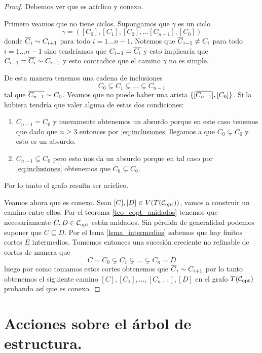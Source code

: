 \documentclass[tesis.tex]{subfiles}
\begin{document}
\begin{proof}
	Debemos ver que es acíclico y conexo.
	
	Primero veamos que no tiene ciclos.
	Supongamos que $\gamma$	es un ciclo
	\[
		\gamma = ([C_0], [C_1], [C_2], \dots [C_{n-1}], [C_0])
	\]
	donde $\overline C_{i} \sim C_{i+1}$ para todo $i=1 \dots n-1$.
	Notemos que $\overline C_{i-1} \neq C_{i}$ para todo $i=1 \dots n-1$ sino tendríamos que $C_{i-1} = \overline{ C_{i}}$ y esto implicaría que $C_{i-1} = \overline{C_{i}} \sim C_{i-1}$
	y esto contradice que el camino $\gamma$ no es simple.
	
	De esta manera tenemos una cadena de inclusiones
	\begin{equation}\label{eq:inclusiones}
			C_0 \subsetneq C_1 \subsetneq \dots  \subsetneq C_{n-1}
	\end{equation}
	tal que $\overline{ C_{n-1}} \sim C_0$.
	Veamos que no puede haber una arista $\{[\overline{ C_{n-1}}], [C_0]\}$.
	Si la hubiera tendría que valer alguna de estas dos condiciones:
	\begin{enumerate}
		\item $C_{n-1} = C_{0}$ y nuevamente obtenemos un absurdo porque en este caso tenemos que dado que $n \ge 3$ entonces por \ref{eq:inclusiones} llegamos a que $C_{0} \subsetneq C_{0}$ y esto es un absurdo.
		
		\item ${C_{n-1}} \subsetneq C_{0}$ pero esto nos da un absurdo porque en tal caso por \ref{eq:inclusiones} obtenemos que $C_{0} \subsetneq C_{0}$.
	\end{enumerate}
	Por lo tanto el grafo resulta ser acíclico.
	
	Veamos ahora que es conexo.
	Sean $[C], [D] \in V(T({\cal C}_{\text{opt}}))$, vamos a construir un camino entre ellos.
	Por el teorema \ref{teo_copt_anidados} tenemos que necesariamente $C,D \in {\cal C}_{\text{opt}}$ están anidados.
	Sin pérdida de generalidad podemos suponer que $C \subseteq D$.
	Por el lema \ref{lema_intermedios} sabemos que hay finitos cortes $E$ intermedios.
	Tomemos entonces una sucesión creciente no refinable de cortes de manera que  
	\[
		C=C_0 \subsetneq C_1 \subsetneq \dots \subsetneq C_n = D
	\]
	luego por como tomamos estos cortes obtenemos que $\overline C_i \sim C_{i+1}$ por lo tanto obtenemos el siguiente camino $[C],[C_1], \dots, [C_{n-1}],[D]$ en el grafo $T({\cal C}_{\text{opt}})$ probando así que es conexo.	
\end{proof}





\section{Acciones sobre el árbol de estructura.}\label{secc_accion_arbol_estr}
\end{document}
